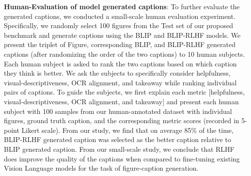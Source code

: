 \documentclass[11pt]{article}
\renewcommand{\cite}[1]{\citep{#1}}
\begin{document}
\textbf{Human-Evaluation of model generated captions}:
To further evaluate the generated captions, we conducted a small-scale human evaluation experiment. Specifically, we randomly select 100 figures from the Test set of our proposed benchmark and generate captions using the BLIP and BLIP-RLHF models. We present the triplet of Figure, corresponding BLIP, and BLIP-RLHF generated captions (after randomizing the order of the two captions) to 10 human subjects. Each human subject is asked to rank the two captions based on which caption they think is better. We ask the subjects to specifically consider helpfulness, visual-descriptiveness, OCR alignment, and takeaway while ranking individual pairs of captions. To guide the subjects, we first explain each metric [helpfulness, visual-descriptiveness, OCR alignment, and takeaway] and present each human subject with 100 samples from our human-annotated dataset with individual figures, ground truth caption, and the corresponding metric scores (recorded in 5-point Likert scale). From our study, we find that on average 85\% of the time, BLIP-RLHF generated caption was selected as the better caption relative to BLIP generated caption. From our small-scale study, we conclude that RLHF does improve the quality of the captions when compared to fine-tuning existing Vision Language models for the task of figure-caption generation.





 



\end{document}
